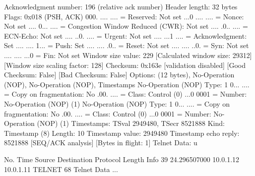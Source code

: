     Acknowledgment number: 196    (relative ack number)
    Header length: 32 bytes
    Flags: 0x018 (PSH, ACK)
        000. .... .... = Reserved: Not set
        ...0 .... .... = Nonce: Not set
        .... 0... .... = Congestion Window Reduced (CWR): Not set
        .... .0.. .... = ECN-Echo: Not set
        .... ..0. .... = Urgent: Not set
        .... ...1 .... = Acknowledgment: Set
        .... .... 1... = Push: Set
        .... .... .0.. = Reset: Not set
        .... .... ..0. = Syn: Not set
        .... .... ...0 = Fin: Not set
    Window size value: 229
    [Calculated window size: 29312]
    [Window size scaling factor: 128]
    Checksum: 0x163e [validation disabled]
        [Good Checksum: False]
        [Bad Checksum: False]
    Options: (12 bytes), No-Operation (NOP), No-Operation (NOP), Timestamps
        No-Operation (NOP)
            Type: 1
                0... .... = Copy on fragmentation: No
                .00. .... = Class: Control (0)
                ...0 0001 = Number: No-Operation (NOP) (1)
        No-Operation (NOP)
            Type: 1
                0... .... = Copy on fragmentation: No
                .00. .... = Class: Control (0)
                ...0 0001 = Number: No-Operation (NOP) (1)
        Timestamps: TSval 2949480, TSecr 8521888
            Kind: Timestamp (8)
            Length: 10
            Timestamp value: 2949480
            Timestamp echo reply: 8521888
    [SEQ/ACK analysis]
        [Bytes in flight: 1]
Telnet
    Data: u

No.     Time           Source                Destination           Protocol Length Info
     39 24.296507000   10.0.1.12             10.0.1.11             TELNET   68     Telnet Data ...

